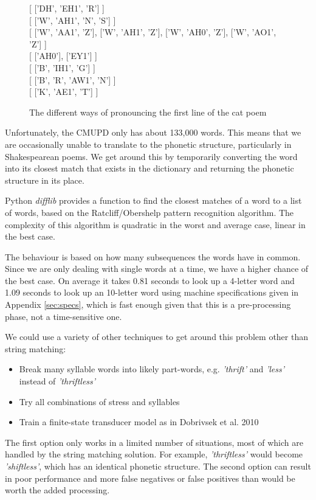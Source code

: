 \begin{figure}
\centering
{[ {['DH', 'EH1', 'R']} ]} \\
{[ {['W', 'AH1', 'N', 'S']} ]}\\
{[ {['W', 'AA1', 'Z']}, {['W', 'AH1', 'Z']}, {['W', 'AH0', 'Z']}, {['W', 'AO1', 'Z']} ]}\\
{[ {['AH0']}, {['EY1']} ]}\\
{[ {['B', 'IH1', 'G']} ]}\\
{[ {['B', 'R', 'AW1', 'N']} ]}\\
{[ {['K', 'AE1', 'T']} ]}
\caption{The different ways of pronouncing the first line of the cat poem}
\label{fig:catpronun}
\end{figure}

Unfortunately, the CMUPD only has about 133,000 words. This means that we are occasionally unable to translate to the phonetic structure, particularly in Shakespearean poems. We get around this by temporarily converting the word into its closest match that exists in the dictionary and returning the phonetic structure in its place.

Python \textit{difflib}\cite{difflib} provides a function to find the closest matches of a word to a list of words, based on the Ratcliff/Obershelp pattern recognition algorithm. The complexity of this algorithm is quadratic in the worst and average case, linear in the best case. 

The behaviour is based on  how many subsequences the words have in common. Since we are only dealing with single words at a time, we have a higher chance of the best case. On average it takes 0.81 seconds to look up a 4-letter word and 1.09 seconds to look up an 10-letter word using machine specifications given in Appendix \ref{sec:specs}, which is fast enough given that this is a pre-processing phase, not a time-sensitive one.

We could use a variety of other techniques to get around this problem other than string matching:
\begin{itemize}
\item{Break many syllable words into likely part-words, e.g. \textit{'thrift'} and \textit{'less'} instead of \textit{'thriftless'}}
\item{Try all combinations of stress and syllables}
\item{Train a finite-state transducer model as in Dobrivsek et al. 2010\cite{dobrivsek2010towards}}
\end{itemize}

The first option only works in a limited number of situations, most of which are handled by the string matching solution. For example, \textit{'thriftless'} would become \textit{'shiftless'}, which has an identical phonetic structure. The second option can result in poor performance and more false negatives or false positives than would be worth the added processing.

